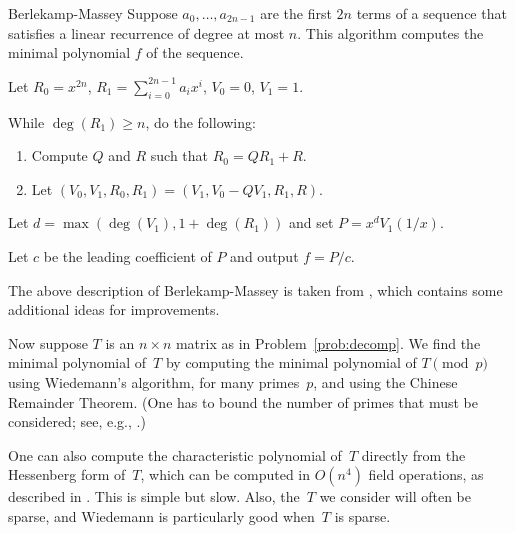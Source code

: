 \begin{algorithm}{Berlekamp-Massey}\label{alg:bm}%
Suppose $a_{0},\ldots , a_{2n-1}$ are the first $2n$ terms of a
sequence that satisfies a linear recurrence of degree at most $n$.
This algorithm computes the minimal 
polynomial $f$ of the sequence.
\begin{steps}
\item Let $R_0 = x^{2n}$, $R_1 = \sum_{i=0}^{2n-1} a_i x^i$, 
$V_0 = 0$, $V_1 = 1$.
\item While $\deg(R_1) \geq n$, do the following:
\begin{enumerate}
\item Compute $Q$ and $R$ such that 
$R_0 = Q R_1 + R$.
\item Let $(V_0, V_1, R_0, R_1) = (V_1, V_0 - QV_1, R_1, R)$.
\end{enumerate}
\item Let $d = \max(\deg(V_1), 1+\deg(R_1))$ and set
$P = x^d V_1(1/x)$.  
\item Let $c$ be the leading coefficient of $P$ and output
      $f = P/c$.
\end{steps}
\end{algorithm}
The above description of Berlekamp-Massey is taken
from \cite{attitoca:berlekamp}, which contains 
some additional ideas for improvements.


Now suppose $T$ is an $n\times n$ matrix as in
Problem~\ref{prob:decomp}.  We find the minimal polynomial of~$T$ by
computing the minimal polynomial of $T\!\!\pmod{p}$ using Wiedemann's
algorithm, for many primes~$p$, and using the Chinese Remainder
Theorem.  (One has to bound the number of primes that must be
considered; see, e.g., \cite{cohen:course_ant}.)

One can also compute the characteristic polynomial of~$T$ directly
from the Hessenberg form of~$T$, which can be computed in $O(n^4)$
field operations, as described in \cite{cohen:course_ant}.  This is
simple but slow.  Also, the~$T$ we consider will often be sparse,
and Wiedemann is particularly good when~$T$ is sparse.


